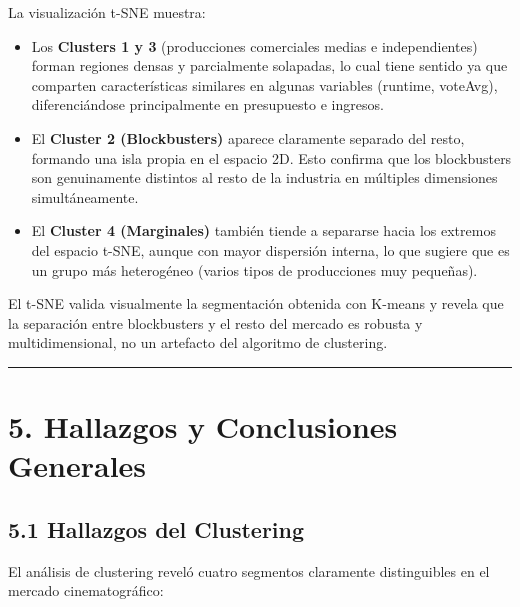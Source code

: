 \documentclass[
]{article}
\providecommand{\tightlist}{%
  \setlength{\itemsep}{0pt}\setlength{\parskip}{0pt}}
\begin{document}
La visualización t-SNE muestra:

\begin{itemize}
\tightlist
\item
  Los \textbf{Clusters 1 y 3} (producciones comerciales medias e
  independientes) forman regiones densas y parcialmente solapadas, lo
  cual tiene sentido ya que comparten características similares en
  algunas variables (runtime, voteAvg), diferenciándose principalmente
  en presupuesto e ingresos.\\
\item
  El \textbf{Cluster 2 (Blockbusters)} aparece claramente separado del
  resto, formando una isla propia en el espacio 2D. Esto confirma que
  los blockbusters son genuinamente distintos al resto de la industria
  en múltiples dimensiones simultáneamente.\\
\item
  El \textbf{Cluster 4 (Marginales)} también tiende a separarse hacia
  los extremos del espacio t-SNE, aunque con mayor dispersión interna,
  lo que sugiere que es un grupo más heterogéneo (varios tipos de
  producciones muy pequeñas).
\end{itemize}

El t-SNE valida visualmente la segmentación obtenida con K-means y
revela que la separación entre blockbusters y el resto del mercado es
robusta y multidimensional, no un artefacto del algoritmo de clustering.

\begin{center}\rule{0.5\linewidth}{0.5pt}\end{center}

\section{5. Hallazgos y Conclusiones
Generales}\label{hallazgos-y-conclusiones-generales}

\subsection{5.1 Hallazgos del
Clustering}\label{hallazgos-del-clustering}

El análisis de clustering reveló cuatro segmentos claramente
distinguibles en el mercado cinematográfico:
\end{document}

